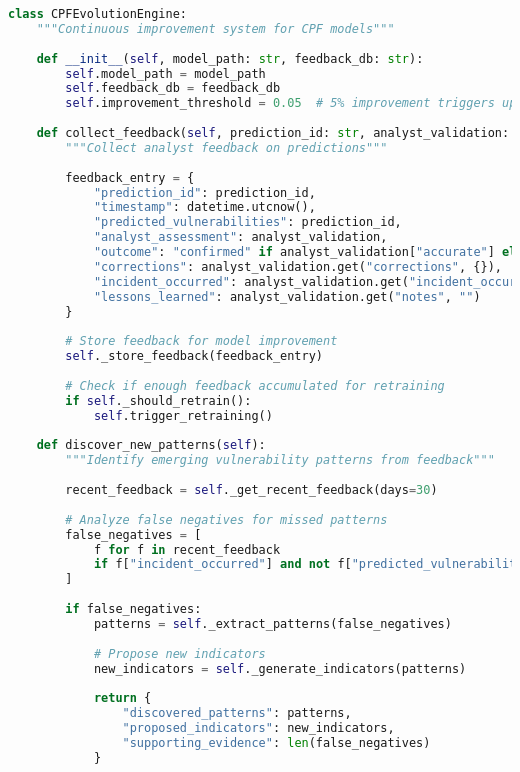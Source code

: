 \documentclass[11pt,a4paper]{article}
\begin{document}
\begin{lstlisting}[language=Python, caption=Self-Improving Feedback System]
class CPFEvolutionEngine:
    """Continuous improvement system for CPF models"""
    
    def __init__(self, model_path: str, feedback_db: str):
        self.model_path = model_path
        self.feedback_db = feedback_db
        self.improvement_threshold = 0.05  # 5% improvement triggers update
        
    def collect_feedback(self, prediction_id: str, analyst_validation: Dict):
        """Collect analyst feedback on predictions"""
        
        feedback_entry = {
            "prediction_id": prediction_id,
            "timestamp": datetime.utcnow(),
            "predicted_vulnerabilities": prediction_id,
            "analyst_assessment": analyst_validation,
            "outcome": "confirmed" if analyst_validation["accurate"] else "rejected",
            "corrections": analyst_validation.get("corrections", {}),
            "incident_occurred": analyst_validation.get("incident_occurred", False),
            "lessons_learned": analyst_validation.get("notes", "")
        }
        
        # Store feedback for model improvement
        self._store_feedback(feedback_entry)
        
        # Check if enough feedback accumulated for retraining
        if self._should_retrain():
            self.trigger_retraining()
    
    def discover_new_patterns(self):
        """Identify emerging vulnerability patterns from feedback"""
        
        recent_feedback = self._get_recent_feedback(days=30)
        
        # Analyze false negatives for missed patterns
        false_negatives = [
            f for f in recent_feedback 
            if f["incident_occurred"] and not f["predicted_vulnerabilities"]
        ]
        
        if false_negatives:
            patterns = self._extract_patterns(false_negatives)
            
            # Propose new indicators
            new_indicators = self._generate_indicators(patterns)
            
            return {
                "discovered_patterns": patterns,
                "proposed_indicators": new_indicators,
                "supporting_evidence": len(false_negatives)
            }
        

\end{lstlisting}
\end{document}
